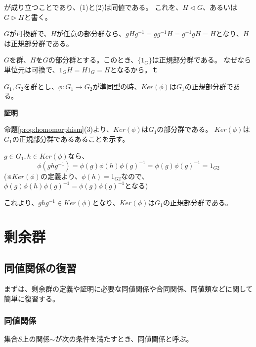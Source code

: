 \documentclass[dvipdfmx,autodetect-engine]{jsarticle}
\begin{document}
\label{defi:normalGroup}

が成り立つことであり、(1)と(2)は同値である。
これを、$H \triangleleft G$、あるいは$G \triangleright H$と書く。

\exam $G$が可換群で、$H$が任意の部分群なら、$gHg^{-1} = gg^{-1}H = g^{-1}gH = H$となり、$H$は正規部分群である。

\exam $G$を群、$H$を$G$の部分群とする。このとき、$\{1_G\}$は正規部分群である。
なぜなら単位元は可換で、$1_GH = H1_G = H$となるから。ｔ

\prop $G_1, G_2$を群とし、$\phi: G_1 \to G_2$が準同型の時、$Ker(\phi)$は$G_1$の正規部分群である。

{\bf 証明}

命題\ref{prop:homomorphism}(3)より、$Ker(\phi)$は$G_1$の部分群である。
$Ker(\phi)$は$G_1$の正規部分群であるあることを示す。

$g \in G_1, h \in Ker(\phi)$なら、
$$
\phi(ghg^{-1}) = \phi(g)\phi(h)\phi(g)^{-1} = \phi(g)\phi(g)^{-1} = 1_{G2}
$$
(※$Ker(\phi)$の定義より、$\phi(h) = 1_{G2}$なので、$\phi(g)\phi(h)\phi(g)^{-1} = \phi(g)\phi(g)^{-1}$となる)

これより、$ghg^{-1} \in Ker(\phi)$となり、$Ker(\phi)$は$G_1$の正規部分群である。

\section{剰余群}

\subsection{同値関係の復習}

まずは、剰余群の定義や証明に必要な同値関係や合同関係、同値類などに関して簡単に復習する。

\subsubsection{同値関係}

集合$S$上の関係$\sim$が次の条件を満たすとき、同値関係と呼ぶ。

\end{document}
